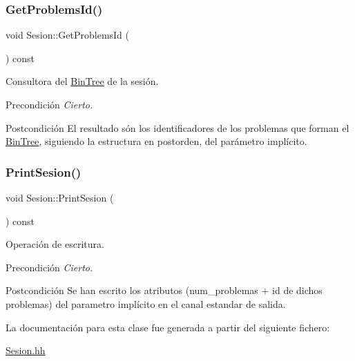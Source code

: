 \subsubsection{\texorpdfstring{Get\+Problems\+Id()}{GetProblemsId()}}
{\footnotesize\ttfamily void Sesion\+::\+Get\+Problems\+Id (\begin{DoxyParamCaption}{ }\end{DoxyParamCaption}) const}



Consultora del \mbox{\hyperlink{class_bin_tree}{Bin\+Tree}} de la sesión. 

\begin{DoxyPrecond}{Precondición}
{\itshape Cierto.} 
\end{DoxyPrecond}
\begin{DoxyPostcond}{Postcondición}
El resultado són los identificadores de los problemas que forman el \mbox{\hyperlink{class_bin_tree}{Bin\+Tree}}, siguiendo la estructura en postorden, del parámetro implícito. 
\end{DoxyPostcond}
\mbox{\label{class_sesion_abd39f61f782fffbaa2e151e0e51b9636}} 
\subsubsection{\texorpdfstring{Print\+Sesion()}{PrintSesion()}}
{\footnotesize\ttfamily void Sesion\+::\+Print\+Sesion (\begin{DoxyParamCaption}{ }\end{DoxyParamCaption}) const}



Operación de escritura. 

\begin{DoxyPrecond}{Precondición}
{\itshape Cierto.} 
\end{DoxyPrecond}
\begin{DoxyPostcond}{Postcondición}
Se han escrito los atributos (num\+\_\+problemas + id de dichos problemas) del parametro implícito en el canal estandar de salida. 
\end{DoxyPostcond}


La documentación para esta clase fue generada a partir del siguiente fichero\+:\begin{DoxyCompactItemize}
\item 
\mbox{\hyperlink{_sesion_8hh}{Sesion.\+hh}}\end{DoxyCompactItemize}
